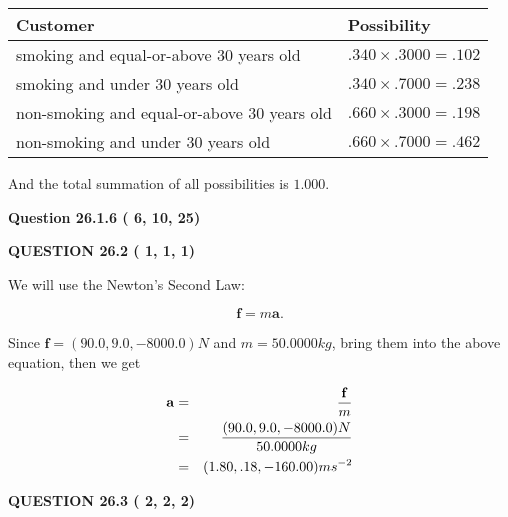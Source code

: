 \documentclass[12pt]{article}
\begin{document}
\noindent
\begin{tabular}{|l|l|}
\hline
Customer & Possibility \\
\hline
smoking  and  %
equal-or-above 30 years old  &
  $ %
.340 \times  %
.3000 =  %
.102$ \\
\hline
smoking  and  %
under 30 years old &
  $ %
.340 \times  %
.7000 =  %
.238$ \\
\hline
 non-smoking and  %
equal-or-above 30 years old  &
  $ %
.660 \times  %
.3000 =  %
.198$ \\
\hline
 non-smoking and  %
under 30 years old &
  $ %
.660 \times  %
.7000 =  %
.462$ \\
\hline
\end{tabular}
 
\noindent
And the total summation of all possibilities is $  %
1.000 $.
 
 
 
 
  
\vspace{0.2in}
  
{\textbf{\Large{Question
26.1.6 
 (          6,         10,         25)
}}}
  
  
  
\vspace{0.2in}
  
{\textbf{\Large{QUESTION
26.2 
 (          1,          1,          1)
}}}
  
  


 
 

We will use the Newton's Second Law:
 
\[
\mathbf{f}=m\mathbf{a}.
\]
 
Since $\mathbf{f}= %
(90.0 , 9.0 , -8000.0) N$
and $m= %
50.0000kg$, bring them into the above equation, then we get
 
\begin{eqnarray*}
\mathbf{a}&=&\frac{\mathbf{f}}m  \\
&=&\frac{ %
(90.0 , 9.0 , -8000.0) N}{ %
50.0000kg}  \\
&=& %
(1.80 , .18 , -160.00) ms^{-2}
\end{eqnarray*}
 
 
 
  
\vspace{0.2in}
  
{\textbf{\Large{QUESTION
26.3 
 (          2,          2,          2)
}}}
  
  
 
 
\end{document}
